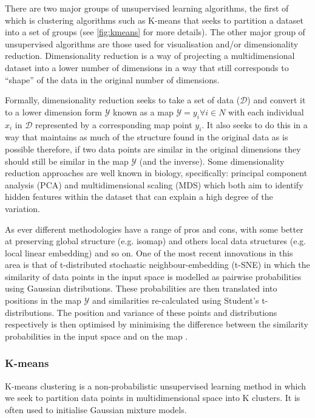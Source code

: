 There are two major groups of unsupervised learning algorithms, the first of which is clustering algorithms
such as K-means that seeks to partition a dataset into a set of groups (see \cref{fig:kmeans} for more details).
The other major group of unsupervised algorithms are those used for visualisation and/or
dimensionality reduction.  Dimensionality reduction is a way of projecting a multidimensional
dataset into a lower number of dimensions in a way that still corresponds to
``shape'' of the data in the original number of dimensions.  

Formally, dimensionality reduction seeks to take a set of data (\(\mathcal{D}\)) and convert it
to a lower dimension form \(\mathcal{Y}\) known as a map \(\mathcal{Y} = {y_{i} \forall i \in N}\) 
with each individual \(x_{i}\) in \(\mathcal{D}\) represented by a corresponding map point \(y_{i}\). It
also seeks to do this in a way that maintains as much of the structure found in the original data 
as is possible \citep{Maaten2008} therefore, if two data points are similar in the original dimensions
they should still be similar in the map \(\mathcal{Y}\) (and the inverse).
Some dimensionality reduction approaches are well known in biology, specifically: principal component analysis (PCA) 
\citep{hotelling1933analysis} and multidimensional scaling (MDS) \citep{Torgerson1952} which both aim to identify
hidden features within the dataset that can explain a high degree of the variation.  


As ever different methodologies have a range of pros and cons, with
some better at preserving global structure (e.g. isomap) and others local data structures (e.g. local linear embedding) and so on.
One of the most recent innovations in this area is that of t-distributed stochastic neighbour-embedding
(t-SNE) in which the similarity of data points in the input space is modelled as pairwise probabilities 
using Gaussian distributions.
These probabilities are then translated into positions in the map \(\mathcal{Y}\) and similarities re-calculated
using Student's t-distributions.  The position and variance of these points and distributions respectively
is then optimised by minimising the difference between the similarity probabilities in the input space
and on the map \citep{Maaten2008}.

\subsubsection{K-means}

K-means clustering is a non-probabilistic unsupervised learning 
method in which we seek to partition data points in multidimensional space into 
K clusters. It is often used to initialise Gaussian mixture models.

